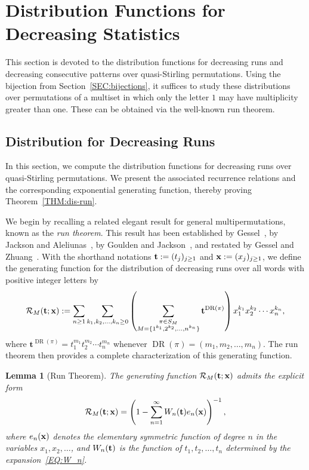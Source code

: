 \documentclass[11pt]{article}
\newcommand{\vt} { {\bf t}}
\newcommand{\vx} { {\bf x}}
\DeclareMathOperator{\DR}{DR}
\numberwithin{equation}{section}
\newtheorem{lem}[thm]{Lemma}
\def\cR{\mathcal{R}}
\begin{document}
\section{Distribution Functions for Decreasing Statistics}\label{SEC:dis}

This section is devoted to the distribution functions for decreasing runs and decreasing consecutive patterns over quasi-Stirling permutations. Using the bijection from Section~\ref{SEC:bijections}, it suffices to study these distributions over permutations of a multiset in which only the letter $1$ may have multiplicity greater than one. These can be obtained via the well-known run theorem.

\subsection{Distribution for Decreasing Runs}\label{SEC:dis-DR}

In this section, we compute the distribution functions for decreasing runs over quasi-Stirling permutations. We present the associated recurrence relations and the corresponding exponential generating function, thereby proving Theorem~\ref{THM:dis-run}.

We begin by recalling a related elegant result for general multipermutations, known as the \textit{run theorem}. This result has been established by Gessel~\cite[Theorem~5.2]{Gessel1977}, by Jackson and Aleliunas~\cite[Theorem~4.1]{Jackson1977}, by Goulden and Jackson~\cite[Theorem~4.2.3]{Goulden1983}, and restated by Gessel and Zhuang~\cite[Theorem~11]{GesselZhuang2014}. With the shorthand notations $\vt:=(t_j)_{j\ge1}$ and $\vx:=(x_j)_{j\ge1}$, we define the generating function for the distribution of decreasing runs over all words with positive integer letters by
\[
\cR_M(\vt;\vx)
:= \sum_{n \ge 1} \sum_{k_1,k_2,\ldots,k_n \ge 0}
\left( \sum_{\substack{\pi \in S_{M}\\ M=\{1^{k_1}, 2^{k_2}, \ldots, n^{k_n}\}}} \mathbf{t}^{\DR(\pi)} \right)
x_1^{k_1} x_2^{k_2} \cdots x_n^{k_n},
\]
where $\mathbf{t}^{\DR(\pi)} = t_1^{m_1} t_2^{m_2} \cdots t_n^{m_n}$ whenever $ \DR(\pi) = (m_1,m_2,\ldots,m_n) $. The run theorem then provides a complete characterization of this generating function.

\begin{lem}[Run Theorem]
	The generating function $ \cR_M(\vt;\vx) $ admits the explicit form
	\begin{align}\label{EQ:GDR}
	\cR_M(\vt;\vx)
	= \left( 1 -\sum_{n=1}^{\infty} W_n(\vt) e_n(\vx) \right)^{-1},
	\end{align}
	where $ e_n(\vx) $ denotes the elementary symmetric function of degree $ n $ in the variables $ x_1, x_2, \ldots $, and $ W_n(\vt) $ is the function of $ t_1, t_2, \ldots, t_n $ determined by the expansion~\eqref{EQ:W_n}.
\end{lem}
\end{document}
